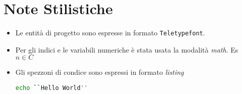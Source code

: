 \clearpage

\section*{Note Stilistiche}
\begin{itemize}
  \item Le entità di progetto sono espresse in formato \texttt{Teletypefont}.
  \item Per gli indici e le variabili numeriche è stata usata la modalità \textit{math}. Es $n \in C$
  \item Gli spezzoni di condice sono espressi in formato \textit{listing}
  \begin{lstlisting}[language=bash]
echo ``Hello World''
  \end{lstlisting}
\end{itemize}